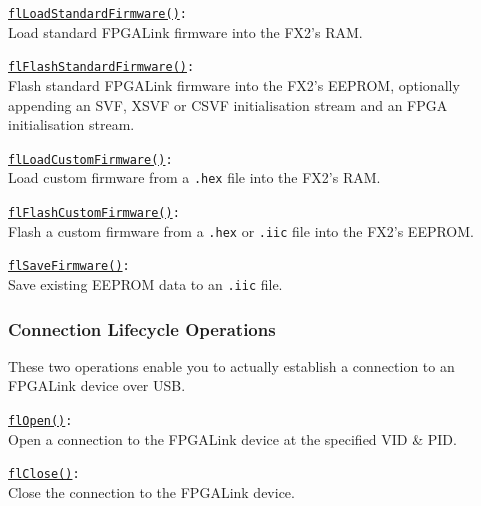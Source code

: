\begin{desc}
  \item[\texttt{\href{http://www.swaton.ukfsn.org/bin/fpgalink-MAKESTUFF_TODAY_DATE/api/libfpgalink\_8h.html\#a45c33041d9f6331e378ca6092646b399}{flLoadStandardFirmware()}:}] \hfill \\
    Load standard FPGALink firmware into the FX2's RAM. 
  \item[\texttt{\href{http://www.swaton.ukfsn.org/bin/fpgalink-MAKESTUFF_TODAY_DATE/api/libfpgalink\_8h.html\#a2b134bdad721202aade02cf3e6ac675b}{flFlashStandardFirmware()}:}] \hfill \\
    Flash standard FPGALink firmware into the FX2's EEPROM, optionally appending an SVF, XSVF or CSVF initialisation stream and an FPGA initialisation stream. 
  \item[\texttt{\href{http://www.swaton.ukfsn.org/bin/fpgalink-MAKESTUFF_TODAY_DATE/api/libfpgalink\_8h.html\#ae14ca5ab58b526815c80ca09793e5e34}{flLoadCustomFirmware()}:}] \hfill \\
    Load custom firmware from a \texttt{.hex} file into the FX2's RAM.
  \item[\texttt{\href{http://www.swaton.ukfsn.org/bin/fpgalink-MAKESTUFF_TODAY_DATE/api/libfpgalink\_8h.html\#a3f39c11daf31e2c1d82b35e88ad9c804}{flFlashCustomFirmware()}:}] \hfill \\
    Flash a custom firmware from a \texttt{.hex} or \texttt{.iic} file into the FX2's EEPROM.
  \item[\texttt{\href{http://www.swaton.ukfsn.org/bin/fpgalink-MAKESTUFF_TODAY_DATE/api/libfpgalink\_8h.html\#addfaedd80f0f40c9a1f134766235b23b}{flSaveFirmware()}:}] \hfill \\
    Save existing EEPROM data to an \texttt{.iic} file.
\end{desc}

\subsubsection{Connection Lifecycle Operations}
These two operations enable you to actually establish a connection to an FPGALink device over USB.

\begin{desc}
  \item[\texttt{\href{http://www.swaton.ukfsn.org/bin/fpgalink-MAKESTUFF_TODAY_DATE/api/libfpgalink\_8h.html\#a241ac59f7ba96caba2e1262ffd0d4424}{flOpen()}:}] \hfill \\
    Open a connection to the FPGALink device at the specified VID \& PID.
  \item[\texttt{\href{http://www.swaton.ukfsn.org/bin/fpgalink-MAKESTUFF_TODAY_DATE/api/libfpgalink\_8h.html\#aec8a71aea72766e3c57fa857c5f5f742}{flClose()}:}] \hfill \\
    Close the connection to the FPGALink device.
\end{desc}

